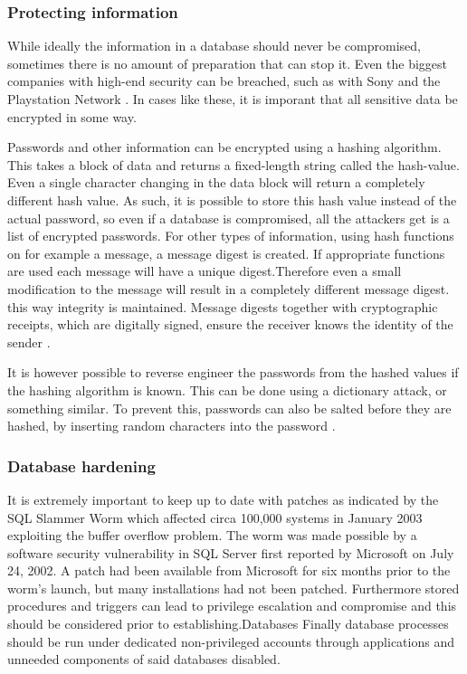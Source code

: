 \documentclass[11pt, twocolumn]{article}
\begin{document}
\subsubsection{Protecting information}
While ideally the information in a database should never be compromised, sometimes there is no amount of preparation that can stop it. Even the biggest companies with high-end security can be breached, such as with Sony and the Playstation Network \cite{sony}.  In cases like these, it is imporant that all sensitive data be encrypted in some way.

Passwords and other information can be encrypted using a hashing algorithm. This takes a block of data and returns a fixed-length string called the hash-value. Even a single character changing in the data block will return a completely different hash value. As such, it is possible to store this hash value instead of the actual password, so even if a database is compromised, all the attackers get is a list of encrypted passwords.
For other types of information, using hash functions on for example a message, a message digest is created. If appropriate functions are used each message will have a unique digest.Therefore even a small modification to the message will result in a completely different message digest. this way integrity is maintained. Message digests together with cryptographic receipts, which are digitally signed, ensure the receiver knows the identity of the sender \cite{Thur}.

It is however possible to reverse engineer the passwords from the hashed values if the hashing algorithm is known. This can be done using a dictionary attack, or something similar. To prevent this, passwords can also be salted before they are hashed, by inserting random characters into the password \cite{salt}.

\subsubsection{Database hardening}
It is extremely important to keep up to date with patches as indicated by the SQL Slammer Worm which affected circa 100,000 systems in January 2003 exploiting the buffer overflow problem. The worm was made possible by a software security vulnerability in SQL Server first reported by Microsoft on July 24, 2002. A patch had been available from Microsoft for six months prior to the worm's launch, but many installations had not been patched.
Furthermore stored procedures and triggers can lead to privilege escalation and compromise and this should be considered prior to establishing.Databases
Finally database processes should be run under dedicated non-privileged accounts through applications and unneeded components of said databases disabled.
\end{document}
